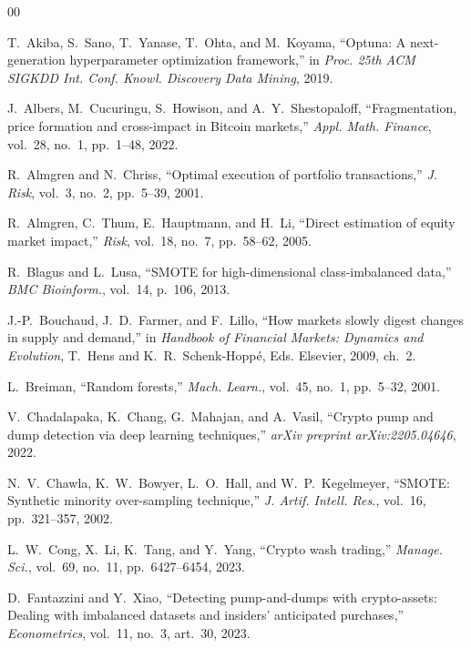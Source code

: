 \documentclass{ieeeaccess}
\begin{document}
\begin{thebibliography}{00}

 T.~Akiba, S.~Sano, T.~Yanase, T.~Ohta, and M.~Koyama, ``Optuna: A next-generation hyperparameter optimization framework,'' in \emph{Proc. 25th ACM SIGKDD Int. Conf. Knowl. Discovery Data Mining}, 2019.

 J.~Albers, M.~Cucuringu, S.~Howison, and A.~Y.~Shestopaloff, ``Fragmentation, price formation and cross-impact in Bitcoin markets,'' \emph{Appl. Math. Finance}, vol.~28, no.~1, pp.~1--48, 2022.

 R.~Almgren and N.~Chriss, ``Optimal execution of portfolio transactions,'' \emph{J. Risk}, vol.~3, no.~2, pp.~5--39, 2001.

 R.~Almgren, C.~Thum, E.~Hauptmann, and H.~Li, ``Direct estimation of equity market impact,'' \emph{Risk}, vol.~18, no.~7, pp.~58--62, 2005.

 R.~Blagus and L.~Lusa, ``SMOTE for high-dimensional class-imbalanced data,'' \emph{BMC Bioinform.}, vol.~14, p.~106, 2013.

 J.-P.~Bouchaud, J.~D.~Farmer, and F.~Lillo, ``How markets slowly digest changes in supply and demand,'' in \emph{Handbook of Financial Markets: Dynamics and Evolution}, T.~Hens and K.~R.~Schenk-Hopp\'{e}, Eds.\hspace{0.25em} Elsevier, 2009, ch.~2.

 L.~Breiman, ``Random forests,'' \emph{Mach. Learn.}, vol.~45, no.~1, pp.~5--32, 2001.

 V.~Chadalapaka, K.~Chang, G.~Mahajan, and A.~Vasil, ``Crypto pump and dump detection via deep learning techniques,'' \emph{arXiv preprint arXiv:2205.04646}, 2022.

 N.~V.~Chawla, K.~W.~Bowyer, L.~O.~Hall, and W.~P.~Kegelmeyer, ``SMOTE: Synthetic minority over-sampling technique,'' \emph{J. Artif. Intell. Res.}, vol.~16, pp.~321--357, 2002.

 L.~W.~Cong, X.~Li, K.~Tang, and Y.~Yang, ``Crypto wash trading,'' \emph{Manage. Sci.}, vol.~69, no.~11, pp.~6427--6454, 2023.

 D.~Fantazzini and Y.~Xiao, ``Detecting pump-and-dumps with crypto-assets: Dealing with imbalanced datasets and insiders' anticipated purchases,'' \emph{Econometrics}, vol.~11, no.~3, art.~30, 2023.


\end{thebibliography}
\end{document}

